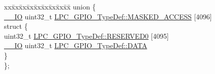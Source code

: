 \begin{DoxyCompactItemize}
\begin{tabbing}
\end{tabbing}\item 
\begin{tabbing}
xx\=xx\=xx\=xx\=xx\=xx\=xx\=xx\=xx\=\kill
union \{\\
\>\hyperlink{group___c_m_s_i_s__core__definitions_gaec43007d9998a0a0e01faede4133d6be}{\_\_IO} uint32\_t \hyperlink{group___l_p_c11xx___definitions_ga42131a82621eb8fd5f55365654dabdba}{LPC\_GPIO\_TypeDef::MASKED\_ACCESS} \mbox{[}4096\mbox{]}\\
\>struct \{\\
\>\>uint32\_t \hyperlink{group___l_p_c11xx___definitions_gaea82533d430cb89b9623ac026edc2517}{LPC\_GPIO\_TypeDef::RESERVED0} \mbox{[}4095\mbox{]}\\
\>\>\hyperlink{group___c_m_s_i_s__core__definitions_gaec43007d9998a0a0e01faede4133d6be}{\_\_IO} uint32\_t \hyperlink{group___l_p_c11xx___definitions_gaef9bb9639cb3af843526756c06ff763e}{LPC\_GPIO\_TypeDef::DATA}\\
\>\} \\
\}; \\


\end{tabbing}
\end{DoxyCompactItemize}
